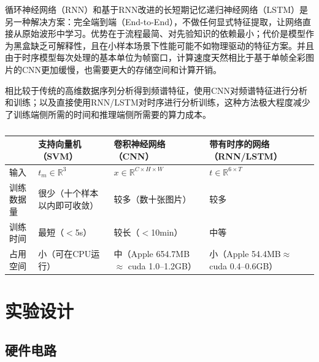 循环神经网络\cite{williams1989rnn}（RNN）和基于RNN改进的长短期记忆递归神经网络\cite{hochreiter1997lstm}（LSTM）是另一种解决方案：完全端到端（End-to-End），不做任何显式特征提取，让网络直接从原始波形中学习。优势在于流程最简、对先验知识的依赖最小；代价是模型作为黑盒缺乏可解释性，且在小样本场景下性能可能不如物理驱动的特征方案。并且由于时序模型每次处理的基本单位为帧窗口，计算速度天然相比于基于单帧全彩图片的CNN更加缓慢，也需要更大的存储空间和计算开销。

相比较于传统的高维数据序列分析得到频谱特征，使用CNN对频谱特征进行分析和训练；以及直接使用RNN/LSTM对时序进行分析训练，这种方法极大程度减少了训练端侧所需的时间和推理端侧所需要的算力成本。

\begin{table}[htbp]
    \centering
    \caption{}
    \label{tab:method_compare}
    {\setlength{\extrarowheight}{2pt}%
    \begin{tabularx}{\linewidth}{|>{\centering\arraybackslash}p{2.2cm}|>{\centering\arraybackslash}X|>{\centering\arraybackslash}X|>{\centering\arraybackslash}X|}
        \hline
         & \textbf{支持向量机（SVM）} & \textbf{卷积神经网络（CNN）} & \textbf{带有时序的网络（RNN/LSTM）} \\
        \hline
        输入 & $t_{m} \in \mathbb{R}^{3}$ & $x \in \mathbb{R}^{C \times H \times W}$ & $t \in \mathbb{R}^{6 \times T}$ \\
        \hline
        训练数据量 & 很少（十个样本以内即可收敛） & 较多（数十张图片） & 较多 \\
        \hline
        训练时间 & 最短（$<$5s） & 较长（$<$10min） & 中等 \\
        \hline
        占用空间 & 小\newline（可在CPU运行） & 中\newline（Apple 654.7MB\newline $\approx$ cuda 1.0--1.2GB） & 小\newline（Apple 54.4MB\newline $\approx$ cuda 0.4--0.6GB） \\
        \hline
    \end{tabularx}}
\end{table}

\section{实验设计}

\subsection{硬件电路}


